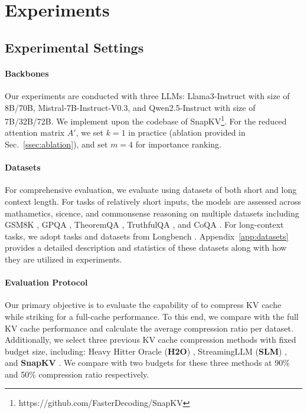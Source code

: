 \section{Experiments}
\subsection{Experimental Settings}
\label{ssec:ex-set}



\paragraph{Backbones} Our experiments are conducted with three LLMs: Llama3-Instruct with size of 8B/70B, Mistral-7B-Instruct-V0.3, and Qwen2.5-Instruct with size of 7B/32B/72B. We implement \method upon the codebase of SnapKV\footnote{https://github.com/FasterDecoding/SnapKV}. For the reduced attention matrix $A'$, we set $k=1$ in practice (ablation provided in Sec.~\ref{ssec:ablation}), and set $m=4$ for importance ranking.

\paragraph{Datasets} For comprehensive evaluation, we evaluate \method using datasets of both short and long context length. For tasks of relatively short inputs, the models are assessed across mathametics, sicence, and commonsense reasoning on multiple datasets including GSM8K \cite{DBLP:journals/corr/abs-2110-14168}, GPQA \cite{DBLP:journals/corr/abs-2311-12022}, TheoremQA \cite{DBLP:conf/emnlp/ChenYKLWMXWX23}, TruthfulQA \cite{DBLP:conf/acl/LinHE22}, and CoQA \cite{DBLP:journals/tacl/ReddyCM19}. For long-context tasks, we adopt tasks and datasets from Longbench \cite{DBLP:conf/acl/BaiLZL0HDLZHDTL24}.
Appendix~\ref{app:datasets} provides a detailed description and statistics of these datasets along with how they are utilized in experiments.

\paragraph{Evaluation Protocol} 
Our primary objective is to evaluate the capability of \method to compress KV cache while striking for a full-cache performance. To this end, we compare \method with the full KV cache performance and calculate the average compression ratio per dataset. 
Additionally, we select three previous KV cache compression methods with fixed budget size, including: Heavy Hitter Oracle (\textbf{H2O}) \cite{DBLP:conf/nips/Zhang00CZC0TRBW23}, StreamingLLM (\textbf{SLM}) \cite{DBLP:conf/iclr/XiaoTCHL24}, and \textbf{SnapKV} \cite{DBLP:conf/nips/LiHYVLYCLC24}.
We compare with two budgets for these three methods at 90\% and 50\% compression ratio respectively.

